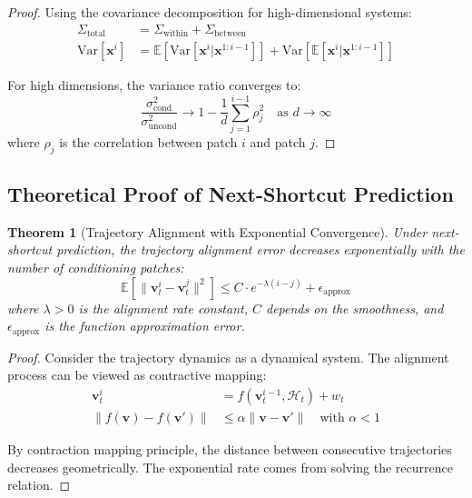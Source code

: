 \documentclass{article}
\theoremstyle{plain}
\newtheorem{theorem}{Theorem}[section]
\theoremstyle{definition}
\theoremstyle{remark}
\newcommand{\vx}{\mathbf{x}}
\newcommand{\vv}{\mathbf{v}}
\begin{document}
\begin{proof}
Using the covariance decomposition for high-dimensional systems:
\begin{align}
\Sigma_{\text{total}} &= \Sigma_{\text{within}} + \Sigma_{\text{between}} \\
\text{Var}[\vx^i] &= \mathbb{E}[\text{Var}[\vx^i|\vx^{1:i-1}]] + \text{Var}[\mathbb{E}[\vx^i|\vx^{1:i-1}]]
\end{align}

For high dimensions, the variance ratio converges to:
\begin{equation}
\frac{\sigma_{\text{cond}}^2}{\sigma_{\text{uncond}}^2} \to 1 - \frac{1}{d}\sum_{j=1}^{i-1} \rho_j^2 \quad \text{as } d \to \infty
\end{equation}
where $\rho_j$ is the correlation between patch $i$ and patch $j$.
\end{proof}

\subsection{Theoretical Proof of Next-Shortcut Prediction}

\begin{theorem}[Trajectory Alignment with Exponential Convergence]
\label{thm:trajectory_alignment}
Under next-shortcut prediction, the trajectory alignment error decreases exponentially with the number of conditioning patches:
\begin{equation}
\mathbb{E}[\| \vv_t^i - \vv_t^j \|^2] \leq C \cdot e^{-\lambda(i-j)} + \epsilon_{\text{approx}}
\end{equation}
where $\lambda > 0$ is the alignment rate constant, $C$ depends on the smoothness, and $\epsilon_{\text{approx}}$ is the function approximation error.
\end{theorem}

\begin{proof}
Consider the trajectory dynamics as a dynamical system. The alignment process can be viewed as contractive mapping:
\begin{align}
\vv_t^{i} &= f(\vv_t^{i-1}, \mathcal{H}_t) + w_t \\
\|f(\vv) - f(\vv')\| &\leq \alpha \|\vv - \vv'\| \quad \text{with } \alpha < 1
\end{align}

By contraction mapping principle, the distance between consecutive trajectories decreases geometrically. The exponential rate comes from solving the recurrence relation.
\end{proof}
\end{document}
